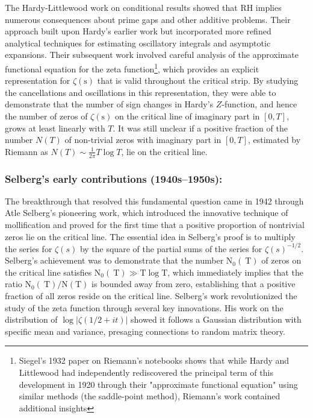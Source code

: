 \documentclass{article}
\begin{document}
The Hardy-Littlewood work \cite{HardyLittlewood} on conditional results showed that RH implies numerous consequences about prime gaps  and other additive problems.  Their approach built upon Hardy's earlier work but incorporated more refined analytical techniques for estimating oscillatory integrals and asymptotic expansions. Their subsequent work involved careful analysis of the approximate functional equation for the zeta function\footnote{Siegel's 1932 paper on Riemann's notebooks shows that while Hardy and Littlewood had independently rediscovered the principal term of this development in 1920 through their "approximate functional equation" using similar methods (the saddle-point method), Riemann's work contained additional insights}, which provides an explicit representation for $\zeta(\mathrm{s})$ that is valid throughout the critical strip. By studying the cancellations and oscillations in this representation, they were able to demonstrate that the number of sign changes in Hardy's $Z$-function, and hence the number of zeros of $\zeta(\mathrm{s})$ on the  critical line of imaginary part in $[0,T]$, grows at least linearly with $T$. It was still unclear if a positive fraction of the number $N(T)$ of non-trivial zeros with imaginary part in $[0,T]$, estimated by Riemann as $N(T)\sim \frac{1}{2\pi}T \log T$,  lie on the critical line.


    
    \subsubsection{Selberg's early contributions (1940s–1950s):}\label{Selberg} The breakthrough that resolved this fundamental question came in 1942 through Atle Selberg's pioneering work, which introduced the innovative technique of mollification and proved for the first time that a positive proportion of nontrivial zeros lie on the critical line. The essential idea in Selberg's proof is to multiply the series for $\zeta(s)$ by the square of the partial sums of the series for $\zeta(s)^{-1/2}$. Selberg's achievement was to demonstrate that the number $\mathrm{N}_0(\mathrm{~T})$ of zeros on the critical line satisfies $\mathrm{N}_0(\mathrm{~T}) \gg \mathrm{T} \log \mathrm{T}$, which immediately implies that the ratio $\mathrm{N}_0(\mathrm{~T}) / \mathrm{N}(\mathrm{T})$ is bounded away from zero, establishing that a positive fraction of all zeros reside on the critical line. Selberg's work \cite{SelbergZeta, SelbergElementary} revolutionized the study of the zeta function through several key innovations.  His work on the distribution of $\log|\zeta(1/2 + it)|$ showed it follows a Gaussian distribution with specific mean and variance, presaging connections to random matrix theory. 
\end{document}
